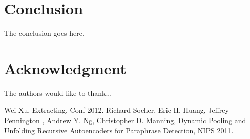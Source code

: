 \documentclass[conference]{IEEEtran}
\begin{document}
\section{Conclusion}
The conclusion goes here.






\section*{Acknowledgment}


The authors would like to thank...







%
%
%
\begin{thebibliography}{1}

Wei Xu, Extracting, Conf 2012.
Richard Socher, Eric H. Huang, Jeffrey Pennington
, Andrew Y. Ng, Christopher D. Manning, Dynamic Pooling and Unfolding Recursive
Autoencoders for Paraphrase Detection, NIPS 2011.

\end{thebibliography}




\end{document}
